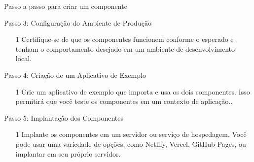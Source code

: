 \documentclass[13pt, xcolor={dvipsnames,svgnames}, portuguese]{beamer}
\begin{document}
\begin{frame}[fragile]{Passo a passo para criar um componente}

  \begin{block}{Passo 3: Configuração do Ambiente de Produção}    
    \begin{itemize}
		\item[1] Certifique-se de que os componentes funcionem conforme o esperado e tenham o comportamento desejado em um ambiente de desenvolvimento local.
	\end{itemize}
  \end{block}

  \begin{block}{Passo 4: Criação de um Aplicativo de Exemplo}    
    \begin{itemize}
		\item[1]  Crie um aplicativo de exemplo que importa e usa os dois componentes. Isso permitirá que você teste os componentes em um contexto de aplicação..
	\end{itemize}
  \end{block}

  \begin{block}{Passo 5: Implantação dos Componentes}    
    \begin{itemize}
		\item[1] Implante os componentes em um servidor ou serviço de hospedagem. Você pode usar uma variedade de opções, como Netlify, Vercel, GitHub Pages, ou implantar em seu próprio servidor.
	\end{itemize}
  \end{block}

\end{frame}
\end{document}

